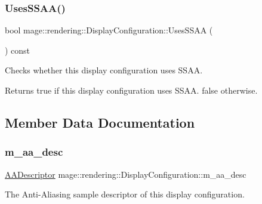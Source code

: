 \subsubsection{\texorpdfstring{Uses\+S\+S\+A\+A()}{UsesSSAA()}}
{\footnotesize\ttfamily bool mage\+::rendering\+::\+Display\+Configuration\+::\+Uses\+S\+S\+AA (\begin{DoxyParamCaption}{ }\end{DoxyParamCaption}) const\hspace{0.3cm}{\ttfamily [noexcept]}}

Checks whether this display configuration uses S\+S\+AA.

\begin{DoxyReturn}{Returns}
{\ttfamily true} if this display configuration uses S\+S\+AA. {\ttfamily false} otherwise. 
\end{DoxyReturn}


\subsection{Member Data Documentation}
\hypertarget{classmage_1_1rendering_1_1_display_configuration_ab23ed45b2cfaf05f56389d97ce11109c}{}\label{classmage_1_1rendering_1_1_display_configuration_ab23ed45b2cfaf05f56389d97ce11109c} 
\subsubsection{\texorpdfstring{m\+\_\+aa\+\_\+desc}{m\_aa\_desc}}
{\footnotesize\ttfamily \hyperlink{namespacemage_1_1rendering_a25c189fd1da946d7a8f0abdd4f0e6afa}{A\+A\+Descriptor} mage\+::rendering\+::\+Display\+Configuration\+::m\+\_\+aa\+\_\+desc\hspace{0.3cm}{\ttfamily [private]}}

The Anti-\/\+Aliasing sample descriptor of this display configuration. \hypertarget{classmage_1_1rendering_1_1_display_configuration_a307a8e6e0b1beb93175a6db519759e86}{}\label{classmage_1_1rendering_1_1_display_configuration_a307a8e6e0b1beb93175a6db519759e86} 
